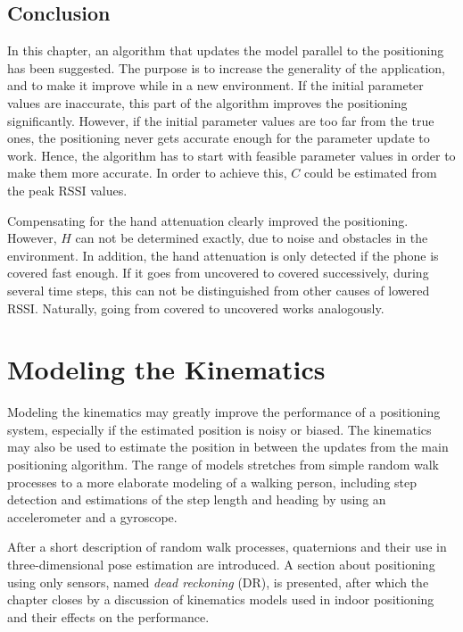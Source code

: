 \documentclass{LTHthesis}
\begin{document}
\section{Conclusion}
In this chapter, an algorithm that updates the model parallel to the positioning has been suggested. The purpose is to increase the generality of the application, and to make it improve while in a new environment. If the initial parameter values are inaccurate, this part of the algorithm improves the positioning significantly. However, if the initial parameter values are too far from the true ones, the positioning never gets accurate enough for the parameter update to work. Hence, the algorithm has to start with feasible parameter values in order to make them more accurate. In order to achieve this, $C$ could be estimated from the peak RSSI values.


Compensating for the hand attenuation clearly improved the positioning. However, $H$ can not be determined exactly, due to noise and obstacles in the environment. In addition, the hand attenuation is only detected if the phone is covered fast enough. If it goes from uncovered to covered successively, during several time steps, this can not be distinguished from other causes of lowered RSSI. Naturally, going from covered to uncovered works analogously.

\chapter{Modeling the Kinematics} %
\label{chap:kin}
%
Modeling the kinematics may greatly improve the performance of a positioning system, especially if the estimated position is noisy or biased. The kinematics may also be used to estimate the position in between the updates from the main positioning algorithm. The range of models stretches from simple random walk processes to a more elaborate modeling of a walking person, including step detection and estimations of the step length and heading by using an accelerometer and a gyroscope. 

After a short description of random walk processes, quaternions and their use in three-dimensional pose  estimation are introduced. A section about positioning using only sensors, named \emph{dead reckoning} (DR), is presented, after which the chapter closes by a discussion of kinematics models used in indoor positioning and their effects on the performance.   
%
\end{document}
